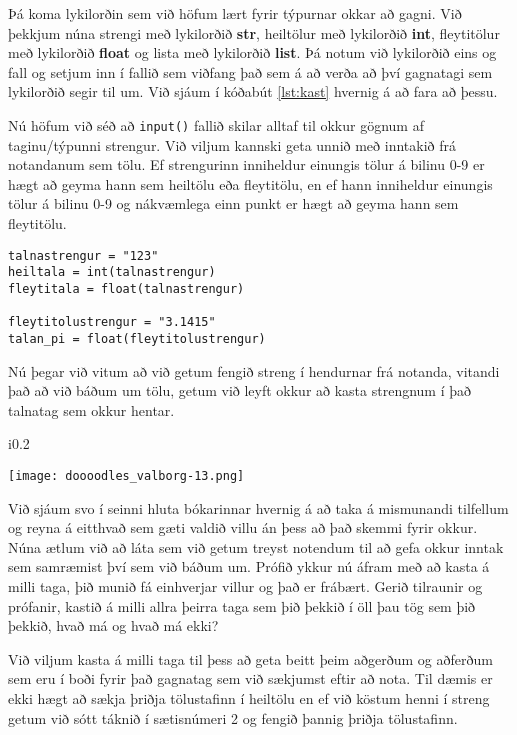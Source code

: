 Þá koma lykilorðin sem við höfum lært fyrir týpurnar okkar að gagni.
Við þekkjum núna strengi með lykilorðið \textbf{str}, heiltölur með lykilorðið \textbf{int}, fleytitölur með lykilorðið \textbf{float} og lista með lykilorðið \textbf{list}.
Þá notum við lykilorðið eins og fall og setjum inn í fallið sem viðfang það sem á að verða að því gagnatagi sem lykilorðið segir til um.
Við sjáum í kóðabút \ref{lst:kast} hvernig á að fara að þessu.

Nú höfum við séð að \texttt{input()} fallið skilar alltaf til okkur gögnum af taginu/týpunni strengur.
Við viljum kannski geta unnið með inntakið frá notandanum sem tölu.
Ef strengurinn inniheldur einungis tölur á bilinu 0-9 er hægt að geyma hann sem heiltölu eða fleytitölu, en ef hann inniheldur einungis tölur á bilinu 0-9 og nákvæmlega einn punkt er hægt að geyma hann sem fleytitölu.


\begin{lstlisting}[caption=Hvernig á að kasta á milli gagnataga, label=lst:kast]
talnastrengur = "123"
heiltala = int(talnastrengur)
fleytitala = float(talnastrengur)

fleytitolustrengur = "3.1415"
talan_pi = float(fleytitolustrengur)
\end{lstlisting}

Nú þegar við vitum að við getum fengið streng í hendurnar frá notanda, vitandi það að við báðum um tölu, getum við leyft okkur að kasta strengnum í það talnatag sem okkur hentar.
\begin{wrapfigure}{i}{0.2\textwidth} %
	\begin{center}
		\texttt{[image: doooodles\_valborg-13.png]}
	\end{center}
\end{wrapfigure}
Við sjáum svo í seinni hluta bókarinnar hvernig á að taka á mismunandi tilfellum og reyna á eitthvað sem gæti valdið villu án þess að það skemmi fyrir okkur.
Núna ætlum við að láta sem við getum treyst notendum til að gefa okkur inntak sem samræmist því sem við báðum um.
Prófið ykkur nú áfram með að kasta á milli taga, þið munið fá einhverjar villur og það er frábært.
Gerið tilraunir og prófanir, kastið á milli allra þeirra taga sem þið þekkið í öll þau tög sem þið þekkið, hvað má og hvað má ekki?

Við viljum kasta á milli taga til þess að geta beitt þeim aðgerðum og aðferðum sem eru í boði fyrir það gagnatag sem við sækjumst eftir að nota.
Til dæmis er ekki hægt að sækja þriðja tölustafinn í heiltölu en ef við köstum henni í streng getum við sótt táknið í sætisnúmeri 2 og fengið þannig þriðja tölustafinn.

